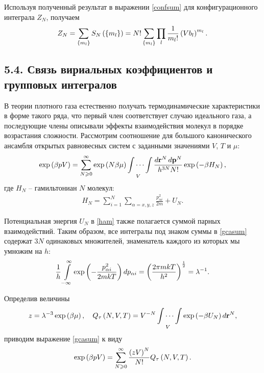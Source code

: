 Используя полученный результат в выражении \eqref{confsum} для конфигурационного интеграла $Z_N$, получаем
\vverh
\begin{gather}
	Z_N = \sum_{\left\{ m_l \right\}} S_N \left( \left\{ m_l \right\} \right) = N! \sum_{\left\{ m_l \right\}} \prod_l \frac{1}{m_l!} \left( V b_l \right)^{m_l}. \label{confsum2}
\end{gather}

\subsection*{\textbf{5.4.} Связь вириальных коэффициентов и групповых интегралов \cite{mayer, meyson}}

В теории плотного газа естественно получать термодинамические характеристики в форме такого ряда, что первый член соответствует случаю идеального газа, а последующие члены описывали эффекты взаимодействия молекул в порядке возрастания сложности. Рассмотрим соотношение для большого канонического ансамбля открытых равновесных систем с заданными значениями $V$, $T$ и $\mu$:
\vverh
\begin{gather}
	\exp \left( \beta p V \right) = \sum_{N \geqslant 0}^\infty \exp \left( N \beta \mu \right) \idotsint\limits_V \frac{d \mathbf{r}^N \, d \mathbf{p}^N}{h^{3N} N!} \exp \left( - \beta H_N \right), \label{gcasum}
\end{gather}
где $H_N$ -- гамильтониан $N$ молекул:
\vverh
\begin{gather}
	H_N = \sum_{i = 1}^N \sum_{\alpha = x, y, z} \frac{p_{\alpha i}^2}{2 m} + U_N. \label{ham}
\end{gather}

Потенциальная энергия $U_N$ в \eqref{ham} также полагается суммой парных взаимодействий. Таким образом, все интегралы под знаком суммы в \eqref{gcasum} содержат $3N$ одинаковых множителей, знаменатель каждого из которых мы умножим на $h$:
\vverh
\begin{gather}
	\frac{1}{h} \int\limits_{-\infty}^{\infty} \exp \left( - \frac{p_{\alpha i}^2}{2m kT} \right) d p_{\alpha i} = \left( \frac{2 \pi m k T}{h^2} \right)^{\frac{1}{2}} = \lambda^{-1}. \notag
\end{gather}

Определив величины
\vverh
\begin{gather}
	z = \lambda^{-3} \exp \left( \beta \mu \right), \quad Q_{\tau} \left( N, V, T \right) = V^{-N} \idotsint\limits_V \exp \left( - \beta U_N \right) d \mathbf{r}^N, \notag
\end{gather}
приводим выражение \eqref{gcasum} к виду
\vverh
\begin{gather}
	\exp \left( \beta p V \right) = \sum_{N \geqslant 0}^\infty \frac{ \left( z V \right)^N}{N!} Q_\tau \left( N, V, T \right). \label{gcasum2} 
\end{gather}

